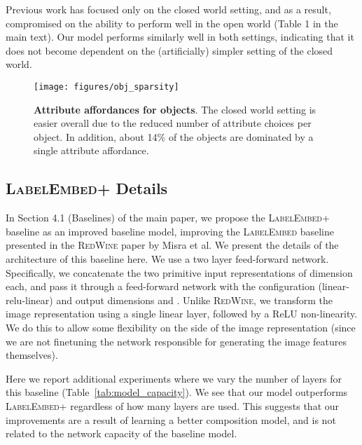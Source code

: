 \documentclass[runningheads]{llncs}
\newcommand{\SC}[1]{{\textsc{#1}}}
\newcommand{\reftbl}[1]{Table~\ref{#1}}
\begin{document}
Previous work has focused only on the closed world setting, and as a result, compromised on the ability to perform well in the open world (Table 1 in the main text). Our model performs similarly well in both settings, indicating that it does not become dependent on the (artificially) simpler setting of the closed world. 

\begin{figure}[t]
\centering
\texttt{[image: figures/obj\_sparsity]}
\caption{\textbf{Attribute affordances for objects}. The closed world setting is easier overall due to the reduced number of attribute choices per object. In addition, about 14\% of the objects are dominated by a single attribute affordance.} 
\label{fig:obj_sparsity}
\end{figure}


\subsection*{\SC{LabelEmbed+} Details}

In Section 4.1 (Baselines) of the main paper, we propose the \SC{LabelEmbed+} baseline as an improved baseline model, improving the \SC{LabelEmbed} baseline presented in the \SC{RedWine} paper by Misra et al.  We present the details of the architecture of this baseline here. We use a two layer feed-forward network. Specifically, we concatenate the two primitive input representations of dimension  each, and pass it through a feed-forward network with the configuration (linear-relu-linear) and output dimensions  and . Unlike \SC{RedWine}, we transform the image representation using a single linear layer, followed by a ReLU non-linearity. We do this to allow some flexibility on the side of the image representation (since we are not finetuning the network responsible for generating the image features themselves).

Here we report additional experiments where we vary the number of layers for this baseline (\reftbl{tab:model_capacity}). We see that our model outperforms \SC{LabelEmbed+} regardless of how many layers are used. This suggests that our improvements are a result of learning a better composition model, and is not related to the network capacity of the baseline model.
\end{document}
